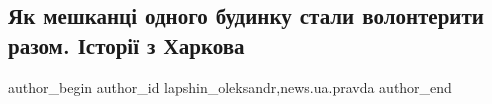  
 
 
 
 
 
\subsection{Як мешканці одного будинку стали волонтерити разом. Історії з Харкова}
\label{sec:17_04_2022.stz.news.ua.pravda.2.budynok_volontery_istorii_harkov}
 
\ifcmt
 author_begin
   author_id lapshin_oleksandr,news.ua.pravda
 author_end
\fi
